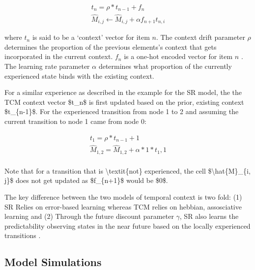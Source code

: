 \begin{equation}
	\begin{aligned}
		t_n = \rho * t_{n-1} + f_n \\ 
		\hat{M}_{i, j} \leftarrow \hat{M}_{i, j} + \alpha f_{n+1} t_{n, i}			
	\end{aligned}
\end{equation}

where $t_n$ is said to be a `context' vector for item $n$. The context drift parameter $\rho$ determines the proportion of the previous elements's context that gets incorporated in the current context. $f_n$ is a one-hot encoded vector for item $n$ . The learning rate parameter $\alpha$ determines what proportion of the currently experienced state binds with the existing context. 

\ac{For a similar experience as described in the example for the SR model, the the TCM context vector $t_n$ is first updated based on the prior, existing context $t_{n-1}$. For the experienced transition from node 1 to 2 and assuming the current transition to node 1 came from node 0:}

\begin{equation}
	\begin{aligned}
		t_1 = \rho*t_{n-1} + 1  \\
		\hat{M}_{1, 2} = \hat{M}_{1, 2} + \alpha*1*t_1,1 \\ 
	\end{aligned}
\end{equation}

\ac{Note that for a transition that is \textit{not} experienced, the cell $\hat{M}_{i, j}$ does not get updated as $f_{n+1}$ would be $0$.}

The key difference between the two models of temporal context is two fold: (1) SR Relies on error-based learning whereas TCM relies on hebbian, assosciative learning and (2) Through the future discount parameter $\gamma$, SR also learns the predictability observing states in the near future based on the locally experienced transitions \cite{gershman2012successor}.

\subsection{Model Simulations}

